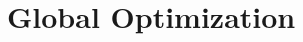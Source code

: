 \section{Global Optimization} \label{S:3.3.Optimization}



\newpage



\newpage



\newpage



\newpage
\clearpage

